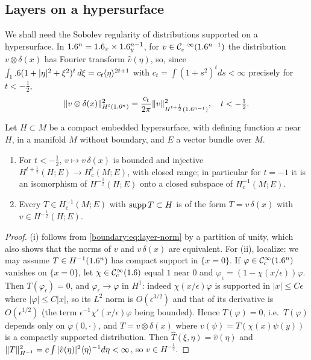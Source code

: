 \subsection*{Layers on a hypersurface}
We shall need the Sobolev regularity of distributions supported on a hypersurface.
In $1.6^n=1.6_x\times1.6^{n-1}_y$, for $v\in\mathcal{C}^{-\infty}_{\mathrm{c}}(1.6^{n-1})$ the distribution $v\otimes
\delta(x)$ has Fourier transform $\hat v(\eta)$, so, since
$\int_1.6(1+|\eta|^2+\xi^2)^t\,d\xi=c_t\langle \eta\rangle^{2t+1}$ with $c_t=\int(1+s^2)^tds
<\infty$ precisely for $t<-\frac12$,
\begin{equation}\label{boundary:eq:layer-norm}
\lVert v\otimes\delta(x)\rVert^2_{H^t(1.6^n)}=\frac{c_t}{2\pi}\lVert v\rVert^2_{H^{t+\frac12}(1.6^{n-1})},
\quad t<-\tfrac12.
\end{equation}

\begin{lemma}\label{boundary:lem:layers}
Let $H\subset M$ be a compact embedded hypersurface, with defining function $x$ near
$H$, in a manifold $M$ without boundary, and $E$ a vector bundle over $M$.
\begin{enumerate}[label=(\roman*)]
\item For $t<-\frac12$, $v\mapsto v\,\delta(x)$ is bounded and injective
$H^{t+\frac12}(H;E)\to H^t_{\mathrm{c}}(M;E)$, with closed range; in particular
for $t=-1$ it is an isomorphism of $H^{-\frac12}(H;E)$ onto a closed subspace of
$H^{-1}_{\mathrm c}(M;E)$.
\item Every $T\in H^{-1}_{\mathrm{c}}(M;E)$ with $\operatorname{supp} T\subset H$ is of the form
$T=v\,\delta(x)$ with $v\in H^{-\frac12}(H;E)$.
\end{enumerate}
\end{lemma}
\begin{proof}
(i) follows from \eqref{boundary:eq:layer-norm} by a partition of unity, which also
shows that the norms of $v$ and $v\,\delta(x)$ are equivalent. For (ii), localize: we
may assume $T\in H^{-1}(1.6^n)$ has compact support in $\{x=0\}$. If $\varphi\in
\mathcal{C}^\infty_{\mathrm{c}}(1.6^n)$ vanishes on $\{x=0\}$, let $\chi\in\mathcal{C}^\infty_{\mathrm{c}}(1.6)$ equal $1$ near $0$ and
$\varphi_\epsilon=(1-\chi(x/\epsilon))\varphi$. Then $T(\varphi_\epsilon)=0$, and
$\varphi_\epsilon\to\varphi$ in $H^1$: indeed $\chi(x/\epsilon)\varphi$ is supported
in $|x|\le C\epsilon$ where $|\varphi|\le C|x|$, so its $L^2$ norm is $O(\epsilon^{3/2})$
and that of its derivative is $O(\epsilon^{1/2})$ (the term $\epsilon^{-1}\chi'(x/\epsilon)
\varphi$ being bounded). Hence $T(\varphi)=0$, i.e.\ $T(\varphi)$ depends only on
$\varphi(0,\cdot)$, and $T=v\otimes\delta(x)$ where $v(\psi)=T(\chi(x)\psi(y))$ is a
compactly supported distribution. Then $\hat T(\xi,\eta)=\hat v(\eta)$ and
$\lVert T\rVert_{H^{-1}}^2=c\int|\hat v(\eta)|^2\langle \eta\rangle^{-1}d\eta<\infty$, so $v\in
H^{-\frac12}$.
\end{proof}

